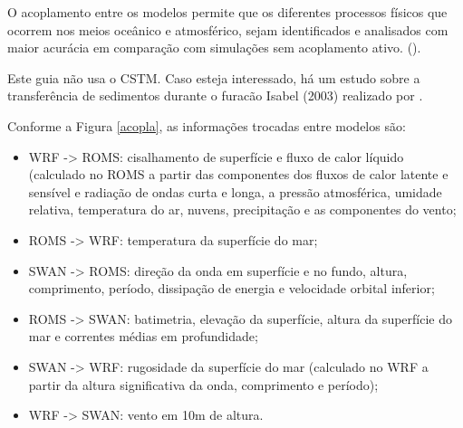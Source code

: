 \noindent O acoplamento entre os modelos permite que os diferentes processos físicos que ocorrem nos meios oceânico e atmosférico, 
          sejam identificados e analisados com maior acurácia em comparação com simulações sem acoplamento ativo. (\cite{Pullen2018, Miller2018}).
\bigskip

\begin{tcolorbox}[enhanced,
  grow to left by   = 0cm,
  grow to right by  = 0cm,
  enlarge top by    = 0cm,
  enlarge bottom by = 0cm,
  tcbox raise base,
  boxrule           = 1.0pt,
  left              = 18mm,
  colframe          = red!50!black,coltext=red!25!black,colback=red!10!white,
  overlay           = {\begin{tcbclipinterior}\fill[red!75!blue!50!white] (frame.south west)
    rectangle node[text=white,font=\sffamily\bfseries\footnotesize,rotate=0] {ATENÇÃO} ([xshift=18mm]frame.north west);\end{tcbclipinterior}}]
Este guia não usa o CSTM. Caso esteja interessado, há um estudo sobre a transferência de sedimentos durante o furacão Isabel (2003) realizado por \textcite{Warner2010}.
\end{tcolorbox}
\bigskip


\noindent Conforme a Figura \textcolor{bleu_cite}{\ref{acopla}}, as informações trocadas entre modelos são:
\bigskip

\begin{itemize}
\item WRF -> ROMS: cisalhamento de superfície e fluxo de calor líquido (calculado no ROMS a partir das componentes dos fluxos de calor latente e sensível e radiação de ondas curta e longa, a pressão atmosférica, umidade relativa, temperatura do ar, nuvens, precipitação e as componentes do vento;
\item ROMS -> WRF: temperatura da superfície do mar;
\item SWAN -> ROMS: direção da onda em superfície e no fundo, altura, comprimento, período, dissipação de energia e velocidade orbital inferior;
\item ROMS -> SWAN: batimetria, elevação da superfície, altura da superfície do mar e correntes médias em profundidade;
\item SWAN -> WRF: rugosidade da superfície do mar (calculado no WRF a partir da altura significativa da onda, comprimento e período);
\item WRF -> SWAN: vento em 10m de altura.
\end{itemize}
\bigskip

